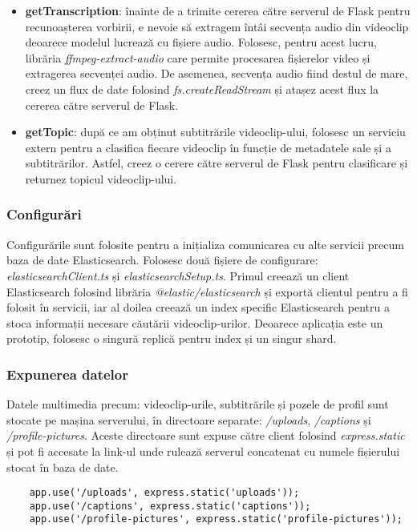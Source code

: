 \begin{itemize}
    \item \textbf{getTranscription}: înainte de a trimite cererea către serverul de Flask pentru 
    recunoașterea vorbirii, e nevoie să extragem întâi secvența audio din videoclip deoarece 
    modelul lucrează cu fișiere audio. Folosesc, pentru acest lucru, librăria \textit{ffmpeg-extract-audio}
    care permite procesarea fișierelor video și extragerea secvenței audio. De asemenea, secvența
    audio fiind destul de mare, creez un flux de date folosind \textit{fs.createReadStream} și 
    atașez acest flux la cererea către serverul de Flask.
    \item \textbf{getTopic}: după ce am obținut subtitrările videoclip-ului, folosesc un serviciu
    extern pentru a clasifica fiecare videoclip în funcție de metadatele sale și a subtitrărilor.
    Astfel, creez o cerere către serverul de Flask pentru clasificare și returnez topicul videoclip-ului.
\end{itemize}

\subsubsection{Configurări}
Configurările sunt folosite pentru a inițializa comunicarea cu alte servicii precum baza de date
Elasticsearch. Folosesc două fișiere de configurare: \textit{elasticsearchClient.ts} și
\textit{elasticsearchSetup.ts}. Primul creează un client Elasticsearch folosind librăria
\textit{@elastic/elasticsearch} și exportă clientul pentru a fi folosit în servicii, iar al doilea
creează un index specific Elasticsearch pentru a stoca informații necesare căutării videoclip-urilor.
Deoarece aplicația este un prototip, folosesc o singură replică pentru index și un singur shard.

\subsubsection{Expunerea datelor}
Datele multimedia precum: videoclip-urile, subtitrările și pozele de profil sunt stocate 
pe mașina serverului, în directoare separate: \textit{/uploads}, \textit{/captions} și
\textit{/profile-pictures}. Aceste directoare sunt expuse către client folosind
\textit{express.static} și pot fi accesate la link-ul unde rulează serverul concatenat
cu numele fișierului stocat în baza de date.


\begin{verbatim}
    app.use('/uploads', express.static('uploads'));
    app.use('/captions', express.static('captions'));
    app.use('/profile-pictures', express.static('profile-pictures'));
\end{verbatim}

